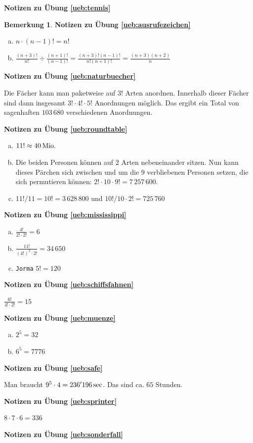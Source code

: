 \documentclass[%
<<<<<<< Updated upstream
11pt,%
twoside,%
titlepage,%
german,%
=======
11pt,%
twoside,%
titlepage,%
swissgerman,%
>>>>>>> Stashed changes
headsepline%
]{scrartcl}
\newcommand{\faReturnGray}{\textcolor{gray}{\faMailReply}} %
\theoremstyle{definition}
\newtheorem{bem}{Bemerkung}[subsection] %
\theoremstyle{plain}
\newcommand{\concatueb}[1]{ueb:#1}%
\newcommand{\concatlsg}[1]{lsg:#1}%
\newenvironment{lsg}[1]{%
    \par\noindent\textbf{Notizen zu Übung \ref{\concatueb{#1}}}\label{\concatlsg{#1}}
    \hfill\hyperref[\concatueb{#1}]{\faReturnGray}\par %
}{%
    \par%
}
\newcounter{theo}[section]\setcounter{theo}{0}
\newcommand{\concatueb}[1]{ueb:#1}%
\newcommand{\concatlsg}[1]{lsg:#1}%
\newenvironment{lsg}[1]{%
    \par\noindent\textbf{Notizen zu Übung \ref{\concatueb{#1}}.}%
    \label{\concatlsg{#1}}
}{%
    \par%
}
\begin{document}
\begin{lsg}{tennis}
\begin{bem}
\begin{lsg}{ausrufezeichen}
\begin{enumerate}[a)]
\item $n\cdot(n-1)!=n!$
\item $\frac{(n+3)!}{n!}\div\frac{(n+1)!}{(n-1)!}=\frac{(n+3)!(n-1)!}{n!(n+1)!}=\frac{(n+3)(n+2)}{n}$
\end{enumerate}
\end{lsg}
\begin{lsg}{naturbuecher}
Die F\"acher kann man paketweise auf $3!$ Arten anordnen. Innerhalb dieser F\"acher sind dann insgesamt $3!\cdot4!\cdot5!$ Anordnungen m\"oglich. Das ergibt ein Total von sagenhaften $103\,680$ verschiedenen Anordnungen.
\end{lsg}
\begin{lsg}{roundtable}
\begin{enumerate}[a)]
\item $11!\approx\unit[40]{Mio.}$
\item Die beiden Personen k\"onnen auf $2$ Arten nebeneinander sitzen. Nun kann dieses P\"archen sich zwischen und um die $9$ verbliebenen Personen setzen, die sich permutieren k\"onnen: $2!\cdot10\cdot 9!=7\,257\,600$.
\item $11!/11=10!=3\,628\,800$ und $10!/10\cdot2!=725\,760$
\end{enumerate}
\end{lsg}
\begin{lsg}{mississippi}
\begin{enumerate}[a)]
\item $\frac{4!}{2!\cdot2!}=6$
\item $\frac{11!}{(4!)^{2}\cdot2!}=34\,650$
\item \texttt{Jorma} $5!=120$
\end{enumerate}
\end{lsg}
\begin{lsg}{schiffsfahnen}
$\frac{6!}{4!\cdot 2!}=15$
\end{lsg}
\begin{lsg}{muenze}
\begin{enumerate}[a)]
\item $2^{5}=32$
\item $6^{5}=7776$
\end{enumerate}
\end{lsg}
\begin{lsg}{safe}
Man braucht $9^{5}\cdot4=\unit[236'196]{sec}$. Das sind ca. $65$ Stunden.
\end{lsg}
\begin{lsg}{sprinter}
$8\cdot7\cdot6=336$
\end{lsg}
\begin{lsg}{sonderfall}

\end{lsg}
\end{bem}
\end{lsg}
\end{document}
